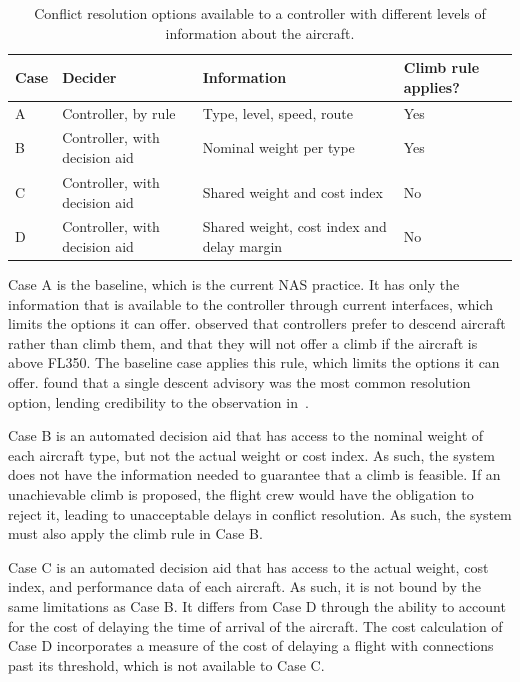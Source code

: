 \begin{table}[h]
\centering
\caption{Conflict resolution options available to a controller with different levels of information about the aircraft. }
\label{tab:cases}
\begin{tabular}{@{}llp{6.2cm}l@{}}
\toprule
Case & Decider & Information & Climb rule applies? \\
\midrule
A & Controller, by rule & Type, level, speed, route & Yes \\
B & Controller, with decision aid & Nominal weight per type & Yes \\
C & Controller, with decision aid & Shared weight and cost index & No \\
D & Controller, with decision aid & Shared weight, cost index and delay margin & No \\
\bottomrule
\end{tabular}
\end{table}

Case A is the baseline, which is the current NAS practice. It has only the information that is available to the controller through current interfaces, which limits the options it can offer. \cite{engility2014tasarAlaska} observed that controllers prefer to descend aircraft rather than climb them, and that they will not offer a climb if the aircraft is above FL350. The baseline case applies this rule, which limits the options it can offer. \cite{rantanen2012conflictManeuvers} found that a single descent advisory was the most common resolution option, lending credibility to the observation in~\cite{engility2014tasarAlaska}.

Case B is an automated decision aid that has access to the nominal weight of each aircraft type, but not the actual weight or cost index. As such, the system does not have the information needed to guarantee that a climb is feasible. If an unachievable climb is proposed, the flight crew would have the obligation to reject it, leading to unacceptable delays in conflict resolution. As such, the system must also apply the climb rule in Case B. 

Case C is an automated decision aid that has access to the actual weight, cost index, and performance data of each aircraft. As such, it is not bound by the same limitations as Case B. It differs from  Case D through the ability to account for the cost of delaying the time of arrival of the aircraft. The cost calculation of Case D incorporates a measure of the cost of delaying a flight with connections past its threshold, which is not available to Case C.

